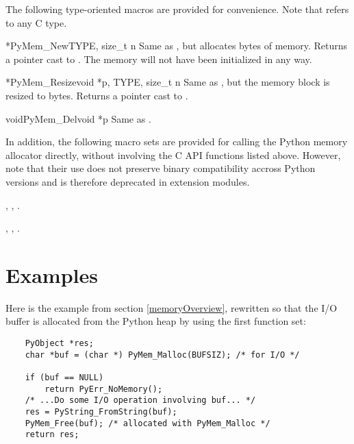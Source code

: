 \documentclass{manual}
\begin{document}
The following type-oriented macros are provided for convenience.  Note 
that  refers to any C type.

\begin{cfuncdesc}{*}{PyMem_New}{TYPE, size_t n}
Same as , but allocates  bytes of memory.  Returns a pointer cast to
.
The memory will not have been initialized in any way.
\end{cfuncdesc}

\begin{cfuncdesc}{*}{PyMem_Resize}{void *p, TYPE, size_t n}
Same as , but the memory block is resized
to  bytes.  Returns a pointer
cast to .
\end{cfuncdesc}

\begin{cfuncdesc}{void}{PyMem_Del}{void *p}
Same as .
\end{cfuncdesc}

In addition, the following macro sets are provided for calling the
Python memory allocator directly, without involving the C API functions
listed above. However, note that their use does not preserve binary
compatibility accross Python versions and is therefore deprecated in
extension modules.

, , .

, , .


\section{Examples \label{memoryExamples}}

Here is the example from section \ref{memoryOverview}, rewritten so
that the I/O buffer is allocated from the Python heap by using the
first function set:

\begin{verbatim}
    PyObject *res;
    char *buf = (char *) PyMem_Malloc(BUFSIZ); /* for I/O */

    if (buf == NULL)
        return PyErr_NoMemory();
    /* ...Do some I/O operation involving buf... */
    res = PyString_FromString(buf);
    PyMem_Free(buf); /* allocated with PyMem_Malloc */
    return res;
\end{verbatim}
\end{document}
